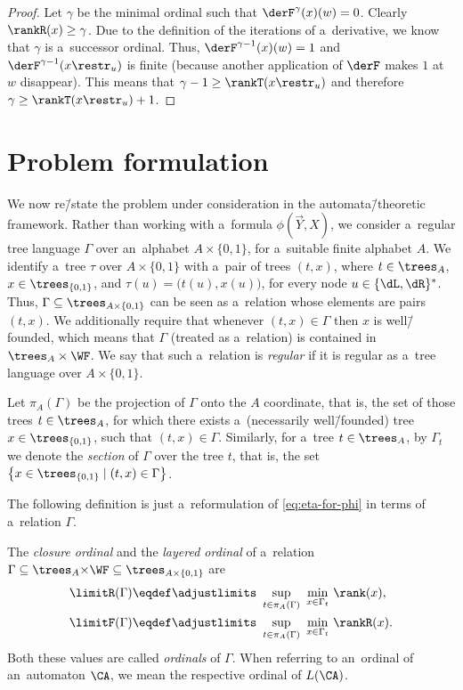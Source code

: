 \documentclass{lmcs}
\numberwithin{equation}{section}
\numberwithin{figure}{section}
\begin{document}
\begin{proof}
	Let $\gamma$ be the minimal ordinal such that $\derF^\gamma(x)(w)=0$.
	Clearly $\rankR(x)\geq\gamma$.
	Due to the definition of the iterations of a~derivative, we know that $\gamma$ is a~successor ordinal.
	Thus, $\derF^{\gamma-1}(x)(w)=1$ and $\derF^{\gamma-1}(x\restr_u)$ is finite (because another application of $\derF$ makes $1$ at $w$ disappear).
	This means that $\gamma-1\geq \rankT(x\restr_u)$ and therefore $\gamma\geq\rankT(x\restr_u)+1$.
\end{proof}



\section{Problem formulation}
\label{sec:problem}

We now re\=/state the problem under consideration in the automata\=/theoretic framework.
Rather than working with a~formula $\phi(\vec{Y},X)$, we consider a~regular tree language $\Gamma$ over an~alphabet $A\times\{0,1\}$, for a~suitable finite alphabet $A$.
We identify a~tree $\tau$ over $A\times\{0,1\}$ with a~pair of trees $(t,x)$, where $t\in\trees_A$, $x\in\trees_{\{0,1\}}$, and $\tau(u)=\big(t(u),x(u)\big)$, for every node $u\in\{\dL,\dR\}^\ast$.
Thus, $\Gamma\subseteq\trees_{A\times\{0,1\}}$ can be seen as a~relation whose elements are pairs $(t,x)$.
We additionally require that whenever $(t,x)\in\Gamma$ then $x$ is well\=/founded, which means that $\Gamma$ (treated as a~relation) is contained in $\trees_A\times \WF$.
We say that such a~relation is \emph{regular} if it is regular as a~tree language over $A\times\{0,1\}$.

Let $\pi_A(\Gamma)$ be the projection of $\Gamma$ onto the $A$ coordinate, that is,
the set of those trees $t\in\trees_A$, for which there exists a~(necessarily well\=/founded) tree $x\in\trees_{\{0,1\}}$, such that $(t,x)\in \Gamma$.
Similarly, for a~tree $t\in\trees_A$, by $\Gamma_t$ we denote the \emph{section} of $\Gamma$ over the tree $t$, that is, the set $\big\{x\in\trees_{\{0,1\}}\mid (t,x)\in\Gamma\big\}$.

The following definition is just a~reformulation of \cref{eq:eta-for-phi} in terms of a~relation $\Gamma$.

\begin{defi}
	The \emph{closure ordinal} and the \emph{layered ordinal} of a~relation $\Gamma\subseteq \trees_A{\times} \WF\subseteq \trees_{A\times\{0,1\}}$ are
	\begin{align*}
	\limitR(\Gamma) &\eqdef\adjustlimits\sup_{\ t\in\pi_A(\Gamma)\ }\min_{x\in\Gamma_t}\, \rank(x),\\
	\limitF(\Gamma) &\eqdef\adjustlimits\sup_{\ t\in\pi_A(\Gamma)\ }\min_{x\in\Gamma_t}\, \rankR(x).\\
	\end{align*}
	Both these values are called \emph{ordinals} of $\Gamma$.
	When referring to an~ordinal of an~automaton $\CA$, we mean the respective ordinal of $L({\CA})$.
\end{defi}
\end{document}
